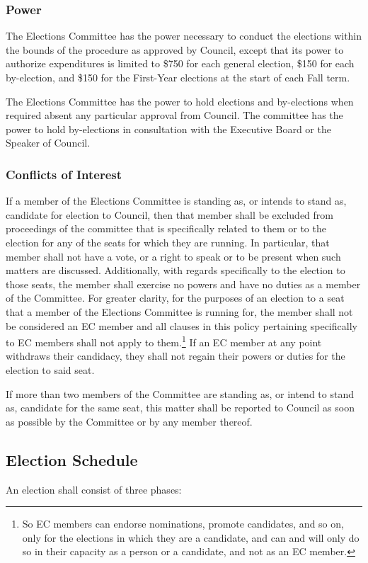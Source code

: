\subsubsection{Power}
The Elections Committee has the power necessary to conduct the elections within the bounds of the procedure as approved by Council, except that its power to authorize expenditures is limited to \$750 for each general election, \$150 for each by-election, and \$150 for the First-Year elections at the start of each Fall term.

The Elections Committee has the power to hold elections and by-elections when required absent any particular approval from Council.
The committee has the power to hold by-elections in consultation with the Executive Board or the Speaker of Council.

\subsubsection{Conflicts of Interest}
If a member of the Elections Committee is standing as, or intends to stand as, candidate for election to Council, then that member shall be excluded from proceedings of the committee that is specifically related to them or to the election for any of the seats for which they are running.
In particular, that member shall not have a vote, or a right to speak or to be present when such matters are discussed.
Additionally, with regards specifically to the election to those seats, the member shall exercise no powers and have no duties as a member of the Committee.
For greater clarity, for the purposes of an election to a seat that a member of the Elections Committee is running for, the member shall not be considered an EC member and all clauses in this policy pertaining specifically to EC members shall not apply to them.\footnote{So EC members can endorse nominations, promote candidates, and so on, only for the elections in which they are a candidate, and can and will only do so in their capacity as a person or a candidate, and not as an EC member.}
If an EC member at any point withdraws their candidacy, they shall not regain their powers or duties for the election to said seat.

If more than two members of the Committee are standing as, or intend to stand as, candidate for the same seat, this matter shall be reported to Council as soon as possible by the Committee or by any member thereof.

\subsection{Election Schedule}
An election shall consist of three phases:

